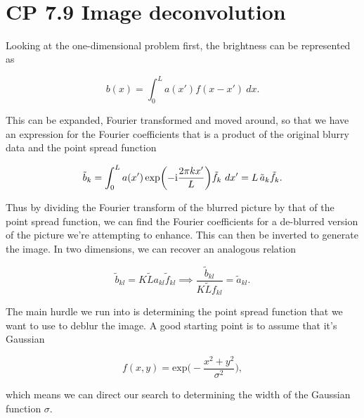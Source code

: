 \documentclass[11pt]{article}
\begin{document}
    \begin{center}
    \end{center}
    { \hspace*{\fill} \\}
    
    \section{CP 7.9 Image deconvolution}\label{cp-7.9-image-deconvolution}

Looking at the one-dimensional problem first, the brightness can be
represented as

\[b(x) = \int_0^L a(x') f(x-x') \ d x.\]

This can be expanded, Fourier transformed and moved around, so that we
have an expression for the Fourier coefficients that is a product of the
original blurry data and the point spread function

\[\tilde{b}_k = \int_0^L a(x')
              \exp\biggl( -\text{i} {2\pi k x'\over L} \biggr)
              \tilde{f}_k \ d x'
            = L\,\tilde{a}_k\tilde{f}_{k}.\]

Thus by dividing the Fourier transform of the blurred picture by that of
the point spread function, we can find the Fourier coefficients for a
de-blurred version of the picture we're attempting to enhance. This can
then be inverted to generate the image. In two dimensions, we can
recover an analogous relation

\[\tilde{b}_{kl} =  K\tilde{L}{a}_{kl}\tilde{f}_{kl} \implies \frac{\tilde{b}_{kl}}{K\tilde{L}{f}_{kl}} = \tilde{a}_{kl}.\]

The main hurdle we run into is determining the point spread function
that we want to use to deblur the image. A good starting point is to
assume that it's Gaussian

\[f(x,y) = \text{exp}\biggr(-\frac{x^2 + y^2}{\sigma^2}\biggr),\]

which means we can direct our search to determining the width of the
Gaussian function \(\sigma.\)
\end{document}

